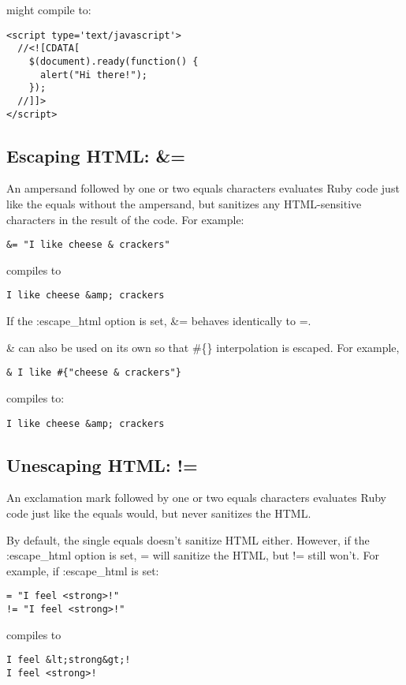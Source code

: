 \documentclass[9pt]{article}
\begin{document}
 might compile to:
\begin{verbatim}
<script type='text/javascript'>
  //<![CDATA[
    $(document).ready(function() {
      alert("Hi there!");
    });
  //]]>
</script>
\end{verbatim}
\subsection{Escaping HTML: \&=}


 An ampersand followed by one or two equals characters evaluates Ruby code just like the equals without the ampersand, but sanitizes any HTML-sensitive characters in the result of the code. For example:
\begin{verbatim}
&= "I like cheese & crackers"
\end{verbatim}


 compiles to
\begin{verbatim}
I like cheese &amp; crackers
\end{verbatim}


 If the :escape\_html option is set, \&= behaves identically to =.


 \& can also be used on its own so that \#\{\} interpolation is escaped. For example,
\begin{verbatim}
& I like #{"cheese & crackers"}
\end{verbatim}


 compiles to:
\begin{verbatim}
I like cheese &amp; crackers
\end{verbatim}
\subsection{Unescaping HTML: !=}


 An exclamation mark followed by one or two equals characters evaluates Ruby code just like the equals would, but never sanitizes the HTML.


 By default, the single equals doesn’t sanitize HTML either. However, if the :escape\_html option is set, = will sanitize the HTML, but != still won’t. For example, if :escape\_html is set:
\begin{verbatim}
= "I feel <strong>!"
!= "I feel <strong>!"
\end{verbatim}


 compiles to
\begin{verbatim}
I feel &lt;strong&gt;!
I feel <strong>!
\end{verbatim}
\end{document}
